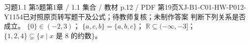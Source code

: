 \par\noindent\begin{minipage}{\linewidth}
\begin{bankitem}{习题1.1 第5题}{第1章 / 1.1 集合 / 教材 p.12 / PDF 第19页}{XJ-B1-C01-HW-P012-Y1154}{已对照原页转写题干及公式；待教师复核；未制作答案}
判断下列关系是否成立。
$\{0\}\in(-2,3)$；
$\{a,c,b\}=\{a,b,c\}$；
$\mathbb R\subseteq(-\infty,-3]$；
$\{1,2,4\}\subsetneq\{x\mid x\text{ 是 }8\text{ 的约数}\}$。
\end{bankitem}
\end{minipage}\par\medskip
